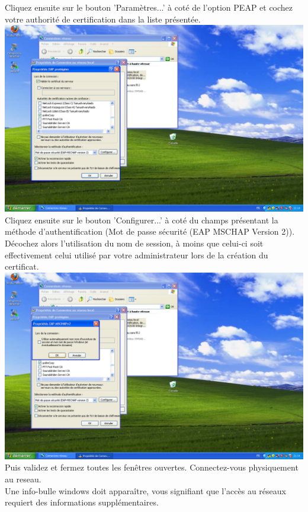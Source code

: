 Cliquez ensuite sur le bouton 'Paramètres...' à coté de l'option PEAP et cochez votre authorité de certification dans la liste présentée.\\
\includegraphics[width=\screenShotSize{}]{img/peapParams.PNG}\\
Cliquez ensuite sur le bouton 'Configurer...' à coté du champs présentant la méthode d'authentification (Mot de passe sécurité (EAP MSCHAP Version 2)).\\
Décochez alors l'utilisation du nom de session, à moins que celui-ci soit effectivement celui utilisé par votre administrateur lors de la création du certificat.\\
\includegraphics[width=\screenShotSize{}]{img/peapParamsConfig.PNG}\\
Puis validez et fermez toutes les fenêtres ouvertes.
Connectez-vous physiquement au reseau.\\
Une info-bulle windows doit apparaître, vous signifiant que l'accès au réseaux requiert des informations supplémentaires.\\
